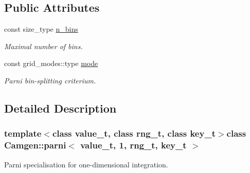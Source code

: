 \subsection*{Public Attributes}
\begin{DoxyCompactItemize}
\item 
\hypertarget{a00385_a515b584c4b08f7c607c1a6ceabf6f395}{const size\-\_\-type \hyperlink{a00385_a515b584c4b08f7c607c1a6ceabf6f395}{n\-\_\-bins}}\label{a00385_a515b584c4b08f7c607c1a6ceabf6f395}

\begin{DoxyCompactList}\small\item\em Maximal number of bins. \end{DoxyCompactList}\item 
\hypertarget{a00385_a714ec9515a194c5b2aa89d79cefd7369}{const grid\-\_\-modes\-::type \hyperlink{a00385_a714ec9515a194c5b2aa89d79cefd7369}{mode}}\label{a00385_a714ec9515a194c5b2aa89d79cefd7369}

\begin{DoxyCompactList}\small\item\em Parni bin-\/splitting criterium. \end{DoxyCompactList}\end{DoxyCompactItemize}


\subsection{Detailed Description}
\subsubsection*{template$<$class value\-\_\-t, class rng\-\_\-t, class key\-\_\-t$>$class Camgen\-::parni$<$ value\-\_\-t, 1, rng\-\_\-t, key\-\_\-t $>$}

Parni specialisation for one-\/dimensional integration. 

